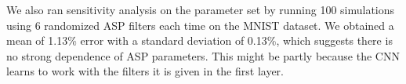 \documentclass[10pt,twocolumn,letterpaper]{article}
\begin{document}
We also ran sensitivity analysis on the parameter set by running 100 simulations using 6 randomized ASP filters each time on the MNIST dataset. We obtained a mean of 1.13\% error with a standard deviation of 0.13\%, which suggests there is no strong dependence of ASP parameters. This might be partly because the CNN learns to work with the filters it is given in the first layer.  

\end{document}
